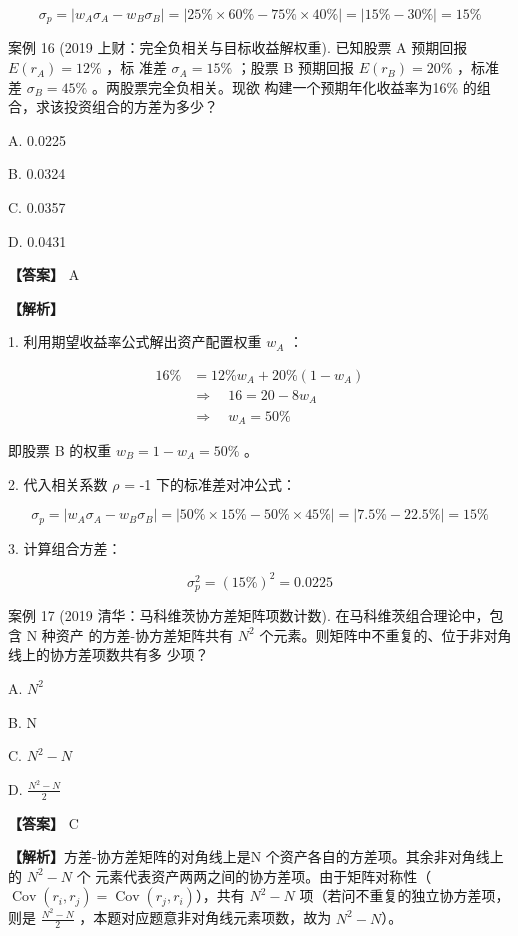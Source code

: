 \documentclass[lang=cn,10pt,color=blue]{elegantbook}
\begin{document}
$$
\sigma_ {p} = | w _ {A} \sigma_ {A} - w _ {B} \sigma_ {B} | = | 25 \% \times 60 \% - 75 \% \times 40 \% | = | 15 \% - 30 \% | = 15 \%
$$

案例 16 (2019 上财：完全负相关与目标收益解权重). 已知股票 A 预期回报 $E ( r _ { A } ) = 1 2 \%$ ，标 准差 $\sigma _ { A } = 1 5 \%$ ；股票 B 预期回报 $E ( r _ { B } ) = 2 0 \%$ ，标准差 $\sigma _ { B } = 4 5 \%$ 。两股票完全负相关。现欲 构建一个预期年化收益率为16\% 的组合，求该投资组合的方差为多少？ 

A. 0.0225 

B. 0.0324 

C. 0.0357 

D. 0.0431 

\textbf{\color{UnivColor} 【答案】} A 

\textbf{\color{UnivColor} 【解析】} 

1. 利用期望收益率公式解出资产配置权重 $w _ { A }$ ： 

$$
\begin{aligned}
  16 \% &= 12 \% w _ {A} + 20 \% (1 - w _ {A}) \\[1.2ex]
  &\Rightarrow \quad 1 6 = 2 0 - 8 w _ {A} \\[1.2ex]
  &\Rightarrow \quad \boxed {w _ {A} = 50 \%}
\end{aligned}
$$

即股票 B 的权重 $w _ { B } = 1 - w _ { A } = 5 0 \%$ 。 

2. 代入相关系数 $\rho$ = -1 下的标准差对冲公式： 

$$
\sigma_ {p} = | w _ {A} \sigma_ {A} - w _ {B} \sigma_ {B} | = | 50\% \times 15\% - 50\% \times 45\% | = | 7.5\% - 22.5\% | = 15\%
$$

3. 计算组合方差： 

$$
\sigma_ {p} ^ {2} = (15\%) ^ {2} = 0. 0 2 2 5
$$

案例 17 (2019 清华：马科维茨协方差矩阵项数计数). 在马科维茨组合理论中，包含 N 种资产 的方差-协方差矩阵共有 $N ^ { 2 }$ 个元素。则矩阵中不重复的、位于非对角线上的协方差项数共有多 少项？ 

A. $N^2$ 

B. N 

C. $N ^ { 2 } - N$ 

D. $\frac{N^2 - N}{2}$ 

\textbf{\color{UnivColor} 【答案】} C 

\textbf{\color{UnivColor} 【解析】}方差-协方差矩阵的对角线上是N 个资产各自的方差项。其余非对角线上的 $N ^ { 2 } - N$ 个 元素代表资产两两之间的协方差项。由于矩阵对称性（$\operatorname{Cov}(r_i, r_j) = \operatorname{Cov}(r_j, r_i)$），共有 $N^2 - N$ 项（若问不重复的独立协方差项，则是 $\frac{N^2 - N}{2}$ ，本题对应题意非对角线元素项数，故为 $N^2 - N$）。
\end{document}
